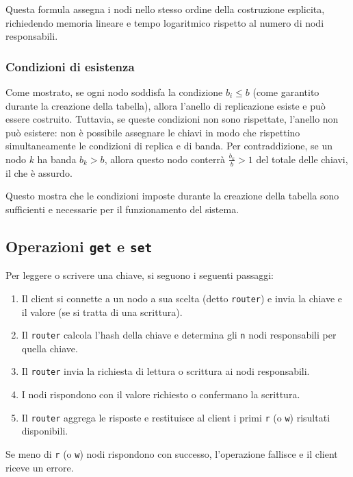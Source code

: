 Questa formula assegna i nodi nello stesso ordine della costruzione esplicita, richiedendo memoria lineare e tempo logaritmico rispetto al numero di nodi responsabili.

\subsubsection{Condizioni di esistenza}
\label{subsubsec:esistenza}

Come mostrato, se ogni nodo soddisfa la condizione $b_i \leq b$ (come garantito durante la creazione della tabella), allora l'anello di replicazione esiste e può essere costruito.
Tuttavia, se queste condizioni non sono rispettate, l'anello non può esistere: non è possibile assegnare le chiavi in modo che rispettino simultaneamente le condizioni di replica e di banda.
Per contraddizione, se un nodo $k$ ha banda $b_k > b$, allora questo nodo conterrà $\frac{b_k}{b} > 1$ del totale delle chiavi, il che è assurdo.

Questo mostra che le condizioni imposte durante la creazione della tabella sono sufficienti e necessarie per il funzionamento del sistema.

\subsection{Operazioni \texttt{get} e \texttt{set}}
\label{subsec:get-set}

Per leggere o scrivere una chiave, si seguono i seguenti passaggi:
\begin{enumerate}
    \item Il client si connette a un nodo a sua scelta (detto \texttt{router}) e invia la chiave e il valore (se si tratta di una scrittura).
    \item Il \texttt{router} calcola l'hash della chiave e determina gli \texttt{n} nodi responsabili per quella chiave.
    \item Il \texttt{router} invia la richiesta di lettura o scrittura ai nodi responsabili.
    \item I nodi rispondono con il valore richiesto o confermano la scrittura.
    \item Il \texttt{router} aggrega le risposte e restituisce al client i primi \texttt{r} (o \texttt{w}) risultati disponibili.
\end{enumerate}

Se meno di \texttt{r} (o \texttt{w}) nodi rispondono con successo, l'operazione fallisce e il client riceve un errore.

